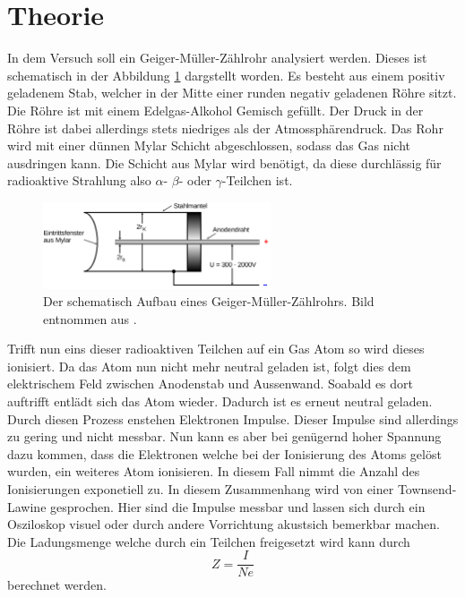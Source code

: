 \section{Theorie}
\label{sec:Theorie}

In dem Versuch soll ein Geiger-Müller-Zählrohr analysiert werden.
Dieses ist schematisch in der Abbildung \ref{fig:geiger} dargstellt worden.
Es besteht aus einem positiv geladenem Stab, welcher in der Mitte einer runden negativ geladenen Röhre sitzt. 
Die Röhre ist mit einem Edelgas-Alkohol Gemisch gefüllt.
Der Druck in der Röhre ist dabei allerdings stets niedriges als der Atmossphärendruck.
Das Rohr wird mit einer dünnen Mylar Schicht abgeschlossen, sodass das Gas nicht ausdringen kann.
Die Schicht aus Mylar wird benötigt, da diese durchlässig für radioaktive Strahlung also $\alpha$- $\beta$- oder $\gamma$-Teilchen ist.
\begin{figure}
    \centering
    \includegraphics[width=0.6\textwidth]{content/data/rohre.png}
    \caption{Der schematisch Aufbau eines Geiger-Müller-Zählrohrs. Bild entnommen aus \cite{anleitung}.}
    \label{fig:geiger}
\end{figure}
\FloatBarrier
Trifft nun eins dieser radioaktiven Teilchen auf ein Gas Atom so wird dieses ionisiert.
Da das Atom nun nicht mehr neutral geladen ist, folgt dies dem elektrischem Feld zwischen Anodenstab und Aussenwand.
Soabald es dort auftrifft entlädt sich das Atom wieder.
Dadurch ist es erneut neutral geladen.
Durch diesen Prozess enstehen Elektronen Impulse.
Dieser Impulse sind allerdings zu gering und nicht messbar.
Nun kann es aber bei genügernd hoher Spannung dazu kommen, dass die Elektronen welche bei der Ionisierung des Atoms gelöst wurden, ein weiteres Atom ionisieren.
In diesem Fall nimmt die Anzahl des Ionisierungen exponetiell zu.
In diesem Zusammenhang wird von einer Townsend-Lawine gesprochen.
Hier sind die Impulse messbar und lassen sich durch ein Osziloskop visuel oder durch andere Vorrichtung akustsich bemerkbar machen.
Die Ladungsmenge welche durch ein Teilchen freigesetzt wird kann durch 
\begin{equation}
    Z = \frac{I}{Ne}
    \label{eq:z}
\end{equation}
berechnet werden.
